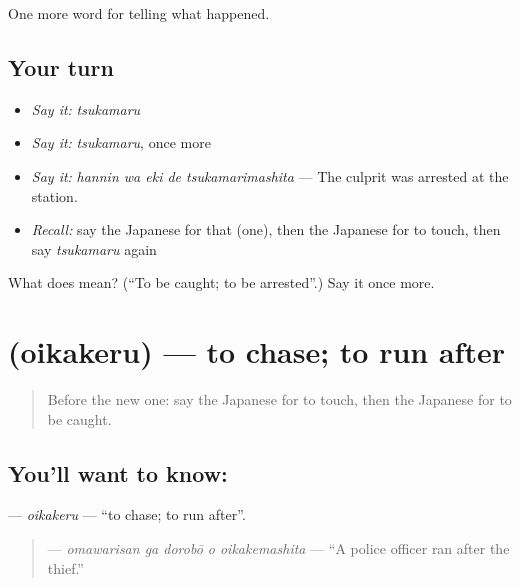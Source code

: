 \begin{grammarlens}[title={What you've built}]
One more word for telling what happened.
\end{grammarlens}

\subsection*{Your turn}
\begin{itemize}
\raggedright
  \item \emph{Say it:} \emph{tsukamaru}
  \item \emph{Say it:} \emph{tsukamaru}, once more
  \item \emph{Say it:} \emph{hannin wa eki de tsukamarimashita} — The culprit was arrested at the station.
  \item \emph{Recall:} say the Japanese for that (one), then the Japanese for to touch, then say \emph{tsukamaru} again
\end{itemize}

\begin{tcolorbox}[breakable,colback=teal!4,colframe=teal!35!black,title={Before you move on}]
What does  mean? (\textquotedblleft{}To be caught; to be arrested\textquotedblright{}.) Say it once more.
\end{tcolorbox}
\section[\texorpdfstring{\ja{おいかける} (oikakeru)}{おいかける (oikakeru)}]{ (oikakeru) — to chase; to run after}

\label{lesson:JA-C271-oikakeru}



\begin{quote}
Before the new one: say the Japanese for to touch, then the Japanese for to be caught.
\end{quote}

\subsection*{You'll want to know: }
\textbf{} — \emph{oikakeru} — \textquotedblleft{}to chase; to run after\textquotedblright{}.

\begin{quote}
\textbf{  } — \emph{omawarisan ga dorobō o oikakemashita} — \textquotedblleft{}A police officer ran after the thief.\textquotedblright{}
\end{quote}

